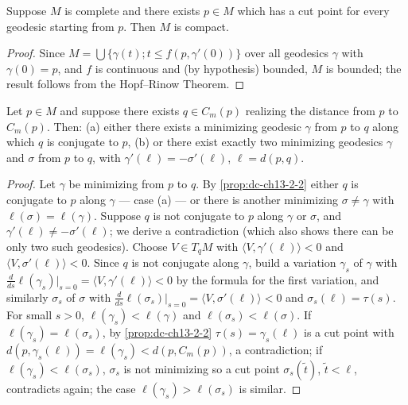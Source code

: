 \begin{corollary}
  \label{cor:dc-ch13-2-11}
  Suppose $M$ is complete and there exists $p\in M$ which has a cut point for every
  geodesic starting from $p$. Then $M$ is compact.
\end{corollary}
\begin{proof}
\sketch
  Since $M=\bigcup\{\gamma(t);t\leq f(p,\gamma'(0))\}$ over all geodesics
  $\gamma$ with $\gamma(0)=p$, and $f$ is continuous and (by hypothesis) bounded, $M$
  is bounded; the result follows from the Hopf–Rinow Theorem.
\end{proof}

\begin{proposition}
  \label{prop:dc-ch13-2-12}
  Let $p\in M$ and suppose there exists $q\in C_m(p)$ realizing the distance from $p$
  to $C_m(p)$. Then:
  (a) either there exists a minimizing geodesic $\gamma$ from $p$ to $q$ along which
    $q$ is conjugate to $p$,
  (b) or there exist exactly two minimizing geodesics $\gamma$ and $\sigma$ from $p$
    to $q$, with $\gamma'(\ell)=-\sigma'(\ell)$, $\ell=d(p,q)$.
\end{proposition}
\begin{proof}
\sketch
  Let $\gamma$ be minimizing from $p$ to $q$. By \cref{prop:dc-ch13-2-2} either $q$
  is conjugate to $p$ along $\gamma$ — case (a) — or there is another minimizing
  $\sigma\neq\gamma$ with $\ell(\sigma)=\ell(\gamma)$. Suppose $q$ is not conjugate to
  $p$ along $\gamma$ or $\sigma$, and $\gamma'(\ell)\neq-\sigma'(\ell)$; we derive a
  contradiction (which also shows there can be only two such geodesics). Choose
  $V\in T_qM$ with $\langle V,\gamma'(\ell)\rangle<0$ and
  $\langle V,\sigma'(\ell)\rangle<0$. Since $q$ is not conjugate along $\gamma$, build
  a variation $\gamma_s$ of $\gamma$ with
  $\frac{d}{ds}\ell(\gamma_s)|_{s=0}=\langle V,\gamma'(\ell)\rangle<0$ by the formula
  for the first variation, and similarly $\sigma_s$ of $\sigma$ with
  $\frac{d}{ds}\ell(\sigma_s)|_{s=0}=\langle V,\sigma'(\ell)\rangle<0$ and
  $\sigma_s(\ell)=\tau(s)$. For small $s>0$, $\ell(\gamma_s)<\ell(\gamma)$ and
  $\ell(\sigma_s)<\ell(\sigma)$. If $\ell(\gamma_s)=\ell(\sigma_s)$, by \cref{prop:dc-ch13-2-2}
  $\tau(s)=\gamma_s(\ell)$ is a cut point with
  $d(p,\gamma_s(\ell))=\ell(\gamma_s)<d(p,C_m(p))$, a contradiction; if
  $\ell(\gamma_s)<\ell(\sigma_s)$, $\sigma_s$ is not minimizing so a cut point
  $\sigma_s(\tilde t)$, $\tilde t<\ell$, contradicts again; the case
  $\ell(\gamma_s)>\ell(\sigma_s)$ is similar.
\end{proof}

